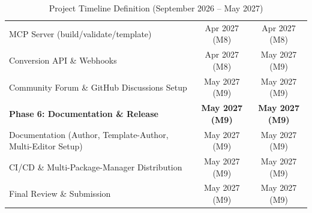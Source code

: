 \documentclass[a4paper,twoside]{article}
\begin{document}
\begin{table}[H]
\begin{tabularx}{\textwidth}{L c c}
    MCP Server (build/validate/template) & Apr 2027 (M8) & Apr 2027 (M8) \\
    Conversion API \& Webhooks & Apr 2027 (M8) & May 2027 (M9) \\
    Community Forum \& GitHub Discussions Setup & May 2027 (M9) & May 2027 (M9) \\
    \midrule
    \textbf{Phase 6: Documentation \& Release} & \textbf{May 2027 (M9)} & \textbf{May 2027 (M9)} \\
    Documentation (Author, Template-Author, Multi-Editor Setup) & May 2027 (M9) & May 2027 (M9) \\
    CI/CD \& Multi-Package-Manager Distribution & May 2027 (M9) & May 2027 (M9) \\
    Final Review \& Submission & May 2027 (M9) & May 2027 (M9) \\
    \bottomrule
  \end{tabularx}
  \caption{Project Timeline Definition (September 2026 -- May 2027)}
  \label{tab:timeline}
\end{table}
\end{document}
